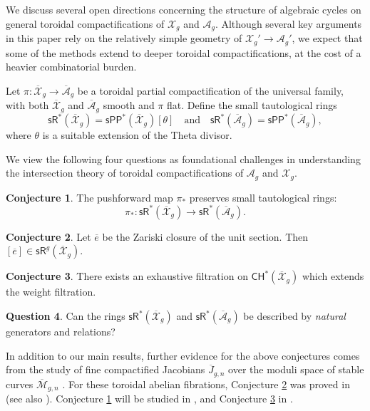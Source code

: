 \documentclass[11pt]{article}
\def\Mbar{\overline{\mathcal{M}}}
\def\CH{\mathsf{CH}}
\def\A{\mathcal{A}}
\def\X{\mathcal{X}}
\def\sR{\mathsf{sR}}
\def\Jbar{\overline{J}}
\def\Xbar{\overline{\mathcal{X}}}
\newcommand{\sPP}{\mathsf{sPP}}
\newcommand{\spp}{\sPP}
\theoremstyle{definition}
\newtheorem{conjecture*}{Conjecture}
\newtheorem{question*}[conjecture*]{Question}
\begin{document}
We discuss several open directions concerning the structure of algebraic cycles on general toroidal compactifications of $\X_g$ and $\A_g$. Although several key arguments in this paper rely on the relatively simple geometry of $\X_g'\to \A_g'$, we expect that some of the methods extend to deeper toroidal compactifications, at the cost of a heavier combinatorial burden.

Let $ \pi : \overline{\mathcal X}_g \to \overline{\mathcal A}_g$ be a toroidal partial compactification of the universal family, with both $\overline{\mathcal X}_g$ and $\overline{\mathcal A}_g$ smooth and $\pi$ flat. Define the small tautological rings
$$
\sR^*(\overline{\mathcal X}_g) = \spp^*(\overline{\mathcal X}_g)[\theta]\quad \text{and}\quad \sR^*(\overline{\mathcal A}_g) = \sPP^*(\overline{\mathcal A}_g),
$$
where $\theta$ is a suitable extension of the Theta divisor.

We view the following four questions as foundational challenges in understanding the intersection theory of toroidal compactifications of $\A_g$ and $\X_g$.

\begin{conjecture*}\label{conj1}
    The pushforward map $\pi_*$ preserves small tautological rings:
    $$
    \pi_* : \sR^*(\overline{\mathcal X}_g) \to \sR^*(\overline{\mathcal A}_g).
    $$
\end{conjecture*}

\begin{conjecture*}\label{conj2}
    Let $\overline{e}$ be the Zariski closure of the unit section. Then $[\overline{e}] \in \sR^g(\overline{\mathcal X}_g)$.
\end{conjecture*}

\begin{conjecture*}\label{conj3}
    There exists an exhaustive filtration on $\CH^*(\Xbar_g)$ which extends the weight filtration.
\end{conjecture*}

\begin{question*}\label{conj4}
    Can the rings $\sR^*(\overline{\mathcal X}_g)$ and $\sR^*(\overline{\mathcal A}_g)$ be described by \emph{natural} generators and relations?
\end{question*}

In addition to our main results, further evidence for the above conjectures comes from the study of fine compactified Jacobians $\Jbar_{g,n}$ over the moduli space of stable curves $\Mbar_{g,n}$ \cite{Caporaso94,KP19}. For these toroidal abelian fibrations, Conjecture \ref{conj2} was proved in \cite{BHPSS} (see also \cite[Proposition 8.3]{BMP}). Conjecture \ref{conj1} will be studied in \cite{BM}, and Conjecture \ref{conj3} in \cite{BP}.
\end{document}
